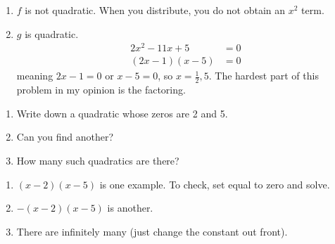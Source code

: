 \documentclass[noauthor]{ximera}
\begin{document}
\begin{problem}
\begin{explanation}
\begin{enumerate}
    \item \(f\) is not quadratic. When you distribute, you do not obtain an \(x^2\) term.
    \item \(g\) is quadratic. 
    \begin{align*}
        2x^2-11x+5 & = 0 \\
        (2x - 1)(x - 5) & = 0
    \end{align*}
    meaning \(2x - 1 = 0\) or \(x - 5 = 0\), so \(x = \frac{1}{2}, 5\). The hardest part of this problem
    in my opinion is the factoring.
\end{enumerate}
\end{explanation}

\end{problem}

\begin{problem}

\begin{enumerate}
    \item Write down a quadratic whose zeros are 2 and 5.
    \item Can you find another?
    \item How many such quadratics are there?
\end{enumerate}

\begin{explanation}
\begin{enumerate}
    \item \((x - 2)(x - 5)\) is one example. To check, set equal to zero and solve.
    \item \(-(x - 2)(x - 5)\) is another.
    \item There are infinitely many (just change the constant out front).
\end{enumerate}
\end{explanation}

\end{problem}
\end{document}

